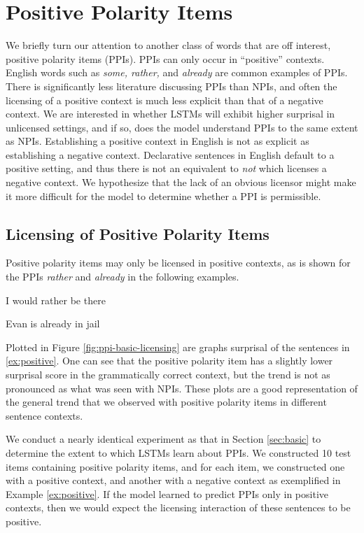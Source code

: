 \documentclass[11pt, round]{article}
\begin{document}
\section{Positive Polarity Items}
We briefly turn our attention to another class of words that are off interest, positive polarity items (PPIs). PPIs can only occur in ``positive'' contexts. English words such as \textit{some, rather,} and \textit{already} are common examples of PPIs. There is significantly less literature discussing PPIs than NPIs, and often the licensing of a positive context is much less explicit than that of a negative context. We are interested in whether LSTMs will exhibit higher surprisal in unlicensed settings, and if so, does the model understand PPIs to the same extent as NPIs. Establishing a positive context in English is not as explicit as establishing a negative context. Declarative sentences in English default to a positive setting, and thus there is not an equivalent to \textit{not} which licenses a negative context. We hypothesize that the lack of an obvious licensor might make it more difficult for the model to determine whether a PPI is permissible.

\subsection{Licensing of Positive Polarity Items}
\label{sec:ppi}
Positive polarity items may only be licensed in positive contexts, as is shown for the PPIs \textit{rather} and \textit{already} in the following examples.
\begin{exe}
\ex \label{ex:positive}
\begin{xlist}
\ex I would rather be there
\end{xlist}
\ex \label{ex:positive2}
\begin{xlist}
\ex Evan is already in jail


\end{xlist}
\end{exe}
Plotted in Figure \ref{fig:ppi-basic-licensing} are graphs surprisal of the sentences in \ref{ex:positive}. One can see that the positive polarity item has a slightly lower surprisal score in the grammatically correct context, but the trend is not as pronounced as what was seen with NPIs. These plots are a good representation of the general trend that we observed with positive polarity items in different sentence contexts.

We conduct a nearly identical experiment as that in Section \ref{sec:basic} to determine the extent to which LSTMs learn about PPIs. We constructed 10 test items containing positive polarity items, and for each item, we constructed one with a positive context, and another with a negative context as exemplified in Example \ref{ex:positive}. If the model learned to predict PPIs only in positive contexts, then we would expect the licensing interaction of these sentences to be positive.
\end{document}
